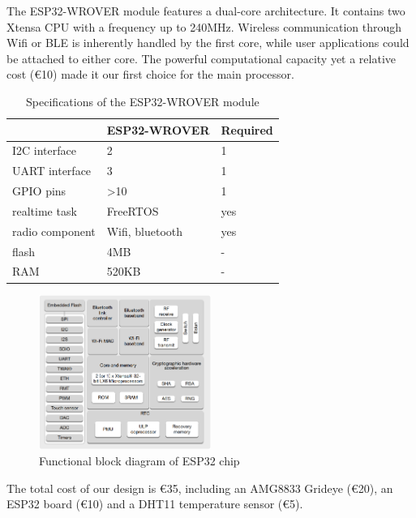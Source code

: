 The ESP32-WROVER module features a dual-core architecture. It contains two Xtensa CPU \cite{xtensa} with a frequency up to 240MHz. Wireless communication through Wifi or BLE is inherently handled by the first core, while user applications could be attached to either core. The powerful computational capacity yet a relative cost (€10) made it our first choice for the main processor.
\begin{table}
  \centering
\begin{tabular}{l|ll}
                & ESP32-WROVER     & Required \\ \hline
I2C interface   & 2                & 1        \\
UART interface  & 3                & 1        \\
GPIO pins       & \textgreater{}10 & 1        \\
realtime task   & FreeRTOS         & yes      \\
radio component & Wifi, bluetooth  & yes      \\
flash           & 4MB              & -        \\
RAM             & 520KB            & -
\end{tabular}
  \caption{Specifications of the ESP32-WROVER module}\label{tab:esp32wrover}
\end{table}
\begin{figure}
  \centering
  \includegraphics[width=0.5\textwidth]{figures/ESP32diagram.PNG}
  \caption{Functional block diagram of ESP32 chip}\label{fig:ESP32diagram}
\end{figure}


The total cost of our design is €35, including an AMG8833 Grideye (€20), an ESP32 board (€10) and a DHT11 temperature sensor (€5).

